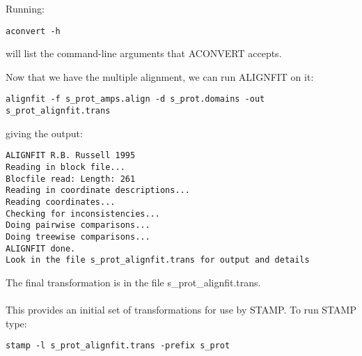 Running:

\begin{scriptsize}\begin{verbatim}
aconvert -h
\end{verbatim} \end{scriptsize}

will list the command-line arguments that ACONVERT accepts.

Now that we have the multiple alignment, we can run ALIGNFIT on it:\\

\begin{scriptsize}\begin{verbatim}
alignfit -f s_prot_amps.align -d s_prot.domains -out s_prot_alignfit.trans
\end{verbatim} \end{scriptsize}

giving the output:\\

\begin{scriptsize}\begin{verbatim}
ALIGNFIT R.B. Russell 1995
Reading in block file...
Blocfile read: Length: 261
Reading in coordinate descriptions...
Reading coordinates...
Checking for inconsistencies...
Doing pairwise comparisons...
Doing treewise comparisons...
ALIGNFIT done.
Look in the file s_prot_alignfit.trans for output and details
\end{verbatim} \end{scriptsize}

The final transformation is in the file s\_prot\_alignfit.trans.\\
\\
This provides an initial set of transformations for use by
STAMP. To run STAMP type:

\begin{scriptsize}\begin{verbatim}
stamp -l s_prot_alignfit.trans -prefix s_prot 
\end{verbatim} \end{scriptsize}

